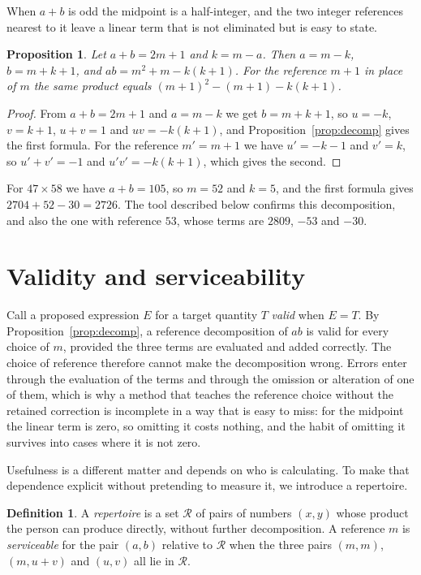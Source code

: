 \documentclass[11pt]{article}
\newtheorem{proposition}{Proposition}
\theoremstyle{definition}
\newtheorem{definition}{Definition}
\theoremstyle{remark}
\begin{document}
When $a+b$ is odd the midpoint is a half-integer, and the two integer references nearest to it leave a linear term that is not eliminated but is easy to state.

\begin{proposition}\label{prop:odd}
Let $a+b=2m+1$ and $k=m-a$. Then $a=m-k$, $b=m+k+1$, and $ab=m^2+m-k(k+1)$. For the reference $m+1$ in place of $m$ the same product equals $(m+1)^2-(m+1)-k(k+1)$.
\end{proposition}

\begin{proof}
From $a+b=2m+1$ and $a=m-k$ we get $b=m+k+1$, so $u=-k$, $v=k+1$, $u+v=1$ and $uv=-k(k+1)$, and Proposition~\ref{prop:decomp} gives the first formula. For the reference $m'=m+1$ we have $u'=-k-1$ and $v'=k$, so $u'+v'=-1$ and $u'v'=-k(k+1)$, which gives the second.
\end{proof}

For $47\times 58$ we have $a+b=105$, so $m=52$ and $k=5$, and the first formula gives $2704+52-30=2726$. The tool described below confirms this decomposition, and also the one with reference $53$, whose terms are $2809$, $-53$ and $-30$.

\section{Validity and serviceability}

Call a proposed expression $E$ for a target quantity $T$ \emph{valid} when $E=T$. By Proposition~\ref{prop:decomp}, a reference decomposition of $ab$ is valid for every choice of $m$, provided the three terms are evaluated and added correctly. The choice of reference therefore cannot make the decomposition wrong. Errors enter through the evaluation of the terms and through the omission or alteration of one of them, which is why a method that teaches the reference choice without the retained correction is incomplete in a way that is easy to miss: for the midpoint the linear term is zero, so omitting it costs nothing, and the habit of omitting it survives into cases where it is not zero.

Usefulness is a different matter and depends on who is calculating. To make that dependence explicit without pretending to measure it, we introduce a repertoire.

\begin{definition}
A \emph{repertoire} is a set $\mathcal R$ of pairs of numbers $(x,y)$ whose product the person can produce directly, without further decomposition. A reference $m$ is \emph{serviceable} for the pair $(a,b)$ relative to $\mathcal R$ when the three pairs $(m,m)$, $(m,u+v)$ and $(u,v)$ all lie in $\mathcal R$.
\end{definition}
\end{document}
